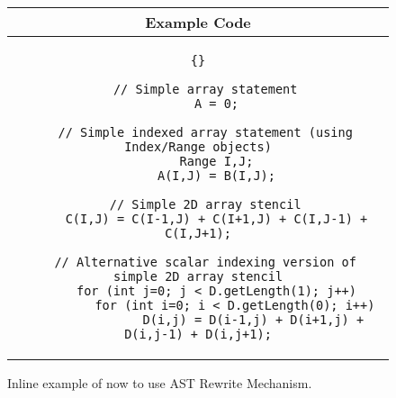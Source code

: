 \begin{figure}[tb]
\begin{center}
\begin{tabular}{|c|} \hline
 Example Code \\\hline\hline
\begin{lstlisting}{}

  // Simple array statement
     A = 0;

  // Simple indexed array statement (using Index/Range objects)
     Range I,J;
     A(I,J) = B(I,J);

  // Simple 2D array stencil
     C(I,J) = C(I-1,J) + C(I+1,J) + C(I,J-1) + C(I,J+1);

  // Alternative scalar indexing version of simple 2D array stencil
     for (int j=0; j < D.getLength(1); j++)
          for (int i=0; i < D.getLength(0); i++)
               D(i,j) = D(i-1,j) + D(i+1,j) + D(i,j-1) + D(i,j+1);

\end{lstlisting}
\\\hline
\end{tabular}
\end{center}
\caption{ Inline example of now to use AST Rewrite Mechanism. }
\label{AST_Code}
\end{figure}













